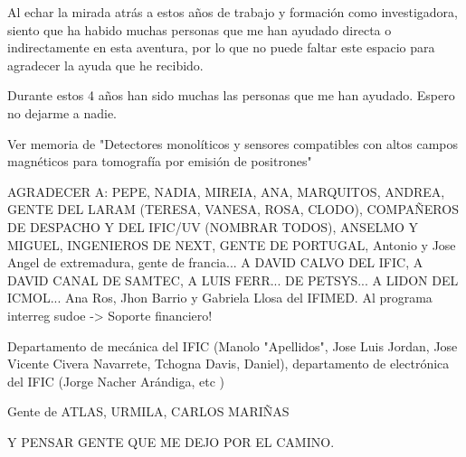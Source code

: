 Al echar la mirada atrás a estos años de trabajo y formación como investigadora, siento que ha habido muchas personas que me han ayudado directa o indirectamente en esta aventura, por lo que no puede faltar este espacio para agradecer la ayuda que he recibido.

Durante estos 4 años han sido muchas las personas que me han ayudado. Espero no dejarme a nadie.

Ver memoria de "Detectores monolíticos y sensores compatibles con altos campos magnéticos para tomografía por emisión de positrones"


AGRADECER A: PEPE, NADIA, MIREIA, ANA, MARQUITOS, ANDREA, GENTE DEL LARAM (TERESA, VANESA, ROSA, CLODO), COMPAÑEROS DE DESPACHO Y DEL IFIC/UV (NOMBRAR TODOS), ANSELMO Y MIGUEL, INGENIEROS DE NEXT, GENTE DE PORTUGAL, Antonio y Jose Angel de extremadura, gente de francia...  A DAVID CALVO DEL IFIC, A DAVID CANAL DE SAMTEC, A LUIS FERR... DE PETSYS... A LIDON DEL ICMOL... Ana Ros, Jhon Barrio y Gabriela Llosa del IFIMED. Al programa interreg sudoe -> Soporte financiero!

Departamento de mecánica del IFIC (Manolo "Apellidos", Jose Luis Jordan, Jose Vicente Civera Navarrete, Tchogna Davis, Daniel), departamento de electrónica del IFIC (Jorge Nacher Arándiga, etc )

Gente de ATLAS, URMILA, CARLOS MARIÑAS


Y PENSAR GENTE QUE ME DEJO POR EL CAMINO.

